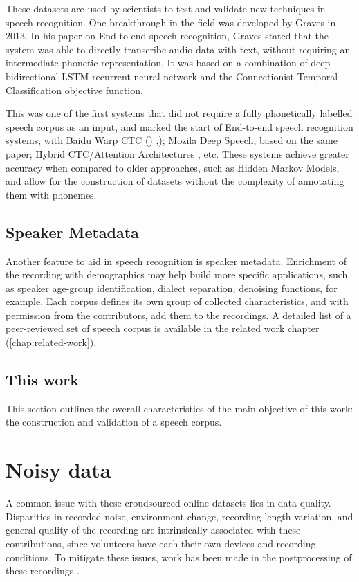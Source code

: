 These datasets are used by scientists to test and validate new techniques in speech recognition. One breakthrough in the field was developed by Graves \cite{graves2013speech} in 2013. In his paper on End-to-end speech recognition, Graves stated that the system was able to directly transcribe audio data with text, without requiring an intermediate phonetic representation. It was based on a combination of deep bidirectional LSTM recurrent neural network and the Connectionist Temporal Classification objective function. 

This was one of the first systems that did not require a fully phonetically labelled speech corpus as an input, and marked the start of End-to-end speech recognition systems, with Baidu Warp CTC (\cite{hannun2014deep}) ,\cite{collobert2016wav2letter}); Mozila Deep Speech, based on the same paper; Hybrid CTC/Attention Architectures \cite{8068205}, etc. These systems achieve greater accuracy when compared to older approaches, such as Hidden Markov Models, and allow for the construction of datasets without the complexity of annotating them with phonemes.

\subsection{Speaker Metadata}

Another feature to aid in speech recognition is speaker metadata. Enrichment of the recording with demographics may help build more specific applications, such as speaker age-group identification, dialect separation, denoising functions, for example. Each corpus defines its own group of collected characteristics, and with permission from the contributors, add them to the recordings. A detailed list of a peer-reviewed set of speech corpus is available in the related work chapter (\ref{chap:related-work}).

\subsection{This work}

This section outlines the overall characteristics of the main objective of this work: the construction and validation of a speech corpus.

\section{Noisy data}

A common issue with these croudsourced online datasets lies in data quality. Disparities in recorded noise, environment change, recording length variation, and general quality of the recording are intrinsically associated with these contributions, since volunteers have each their own devices and recording conditions. To mitigate these issues, work has been made in the postprocessing of these recordings \cite{krishna2019speech}.

